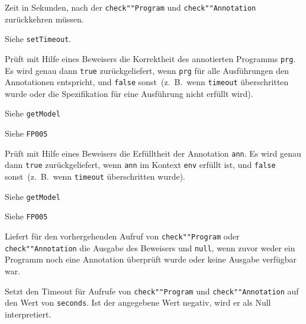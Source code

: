 
\begin{description}%

    Zeit in Sekunden, nach der \texttt{check""Program} und
    \texttt{check""Annotation} zurückkehren müssen.%

    Siehe \texttt{setTimeout}.%


\end{description}%


\begin{description}%


    Prüft mit Hilfe eines Beweisers die Korrektheit des annotierten
    Programms \texttt{prg}. Es wird genau dann \texttt{true}
    zurückgeliefert, wenn \texttt{prg} für alle Ausführungen den
    Annotationen entspricht, und \texttt{false} sonst~(z.~B.\, wenn
    \texttt{timeout} überschritten wurde oder die Spezifikation für
    eine Ausführung nicht erfüllt wird).%

    Siehe \texttt{getModel}%

    Siehe \texttt{FP005}%


    Prüft mit Hilfe eines Beweisers die Erfülltheit der Annotation
    \texttt{ann}. Es wird genau dann \texttt{true} zurückgeliefert,
    wenn \texttt{ann} im Kontext \texttt{env} erfüllt ist, und
    \texttt{false} sonst~(z.~B.\, wenn \texttt{timeout} überschritten
    wurde).%

    Siehe \texttt{getModel}%

    Siehe \texttt{FP005}%


    Liefert für den vorhergehenden Aufruf von \texttt{check""Program}
    oder \texttt{check""Annotation} die Ausgabe des Beweisers und
    \texttt{null}, wenn zuvor weder ein Programm noch eine Annotation
    überprüft wurde oder keine Ausgabe verfügbar war.%


    Setzt den Timeout für Aufrufe von \texttt{check""Program} und
    \texttt{check""Annotation} auf den Wert von \texttt{seconds}. Ist
    der angegebene Wert negativ, wird er als Null interpretiert.%

\end{description}%

